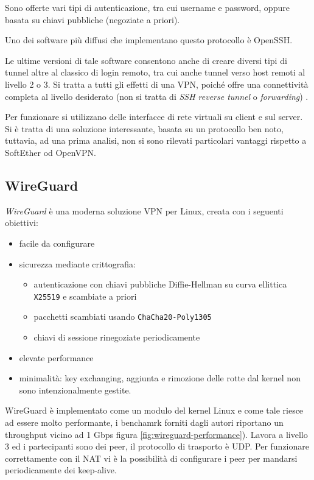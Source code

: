 Sono offerte vari tipi di autenticazione, tra cui username e password, oppure basata
su chiavi pubbliche (negoziate a priori).

Uno dei software più diffusi che implementano questo protocollo è OpenSSH.

Le ultime versioni di tale software consentono anche di creare
diversi tipi di tunnel altre al classico di login remoto, tra cui anche tunnel verso
host remoti al livello 2 o 3. Si tratta a tutti gli effetti di una VPN, poiché
offre una connettività completa al livello desiderato (non si tratta di
\textit{SSH reverse tunnel} o \textit{forwarding})
\cite{ssh-vpn-ubuntu} \cite{ssh-vpn-debian}.

Per funzionare si utilizzano delle interfacce di rete virtuali
su client e sul server. Si è tratta di una soluzione interessante, basata su un
protocollo ben noto, tuttavia, ad una prima analisi, non si sono rilevati
particolari vantaggi rispetto a SoftEther od OpenVPN.

\subsection{WireGuard}
\textit{WireGuard}\cite{DBLP:conf/ndss/Donenfield17} è una moderna soluzione VPN per Linux, creata con i seguenti obiettivi:
\begin{itemize}
	\item facile da configurare
	\item sicurezza mediante crittografia:
	      \begin{itemize}
	      	\item autenticazione con chiavi pubbliche Diffie-Hellman su curva ellittica \texttt{X25519}
	      	      e scambiate a priori \cite{RFC7748}
	      	\item pacchetti scambiati usando \texttt{ChaCha20-Poly1305} \cite{RFC7539}
	      		\item chiavi di sessione rinegoziate periodicamente
	      	\end{itemize}
	      	\item elevate performance
	      	\item minimalità: key exchanging, aggiunta e rimozione delle rotte dal kernel
	      	      non sono intenzionalmente gestite.
	      \end{itemize}
	      WireGuard è implementato come un modulo del kernel Linux e come tale riesce ad essere
	      molto performante, i benchamrk forniti dagli autori riportano un throughput vicino
	      ad 1 Gbps figura \ref{fig:wireguard-performance}).
	      Lavora a livello 3 ed i partecipanti sono dei peer,
	      il protocollo di trasporto è UDP. Per funzionare correttamente con il NAT vi è
	      la possibilità di configurare i peer per mandarsi periodicamente dei keep-alive.
	      
